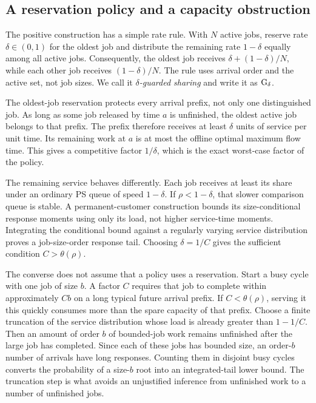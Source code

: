 \subsection{A reservation policy and a capacity obstruction}
The positive construction has a simple rate rule. With $N$ active jobs, reserve rate $\delta\in(0,1)$ for the oldest job and distribute the remaining rate $1-\delta$ equally among all active jobs. Consequently, the oldest job receives $\delta+(1-\delta)/N$, while each other job receives $(1-\delta)/N$. The rule uses arrival order and the active set, not job sizes. We call it \emph{$\delta$-guarded sharing} and write it as $\operatorname{G}_\delta$.

The oldest-job reservation protects every arrival prefix, not only one distinguished job. As long as some job released by time $a$ is unfinished, the oldest active job belongs to that prefix. The prefix therefore receives at least $\delta$ units of service per unit time. Its remaining work at $a$ is at most the offline optimal maximum flow time. This gives a competitive factor $1/\delta$, which is the exact worst-case factor of the policy.

The remaining service behaves differently. Each job receives at least its share under an ordinary PS queue of speed $1-\delta$. If $\rho<1-\delta$, that slower comparison queue is stable. A permanent-customer construction bounds its size-conditional response moments using only its load, not higher service-time moments. Integrating the conditional bound against a regularly varying service distribution proves a job-size-order response tail. Choosing $\delta=1/C$ gives the sufficient condition $C>\theta(\rho)$.

The converse does not assume that a policy uses a reservation. Start a busy cycle with one job of size $b$. A factor $C$ requires that job to complete within approximately $Cb$ on a long typical future arrival prefix. If $C<\theta(\rho)$, serving it this quickly consumes more than the spare capacity of that prefix. Choose a finite truncation of the service distribution whose load is already greater than $1-1/C$. Then an amount of order $b$ of bounded-job work remains unfinished after the large job has completed. Since each of these jobs has bounded size, an order-$b$ number of arrivals have long responses. Counting them in disjoint busy cycles converts the probability of a size-$b$ root into an integrated-tail lower bound. The truncation step is what avoids an unjustified inference from unfinished work to a number of unfinished jobs.

